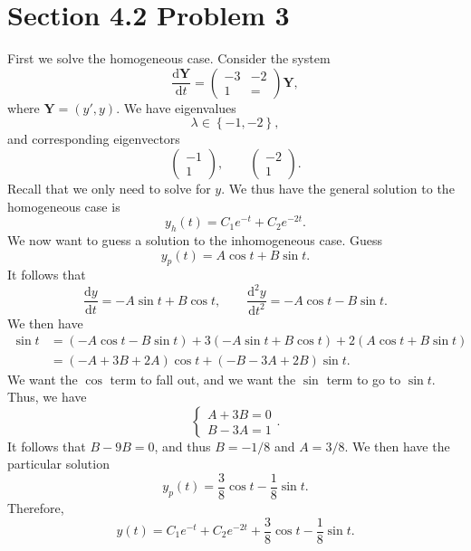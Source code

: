 \documentclass[11pt, letterpaper]{report}
\begin{document}
\section*{Section 4.2 Problem 3}
First we solve the homogeneous case. Consider the system
\[
	\frac{\mathrm{d}\mathbf{Y}}{\mathrm{d}t} =\begin{pmatrix}
		-3&-2\\
		1&=
	\end{pmatrix} \mathbf{Y}
,\]
where $\mathbf{Y}=(y',y)$. We have eigenvalues
\[
	\lambda \in \left\{ -1,-2 \right\} 
,\]
and corresponding eigenvectors
\[
	\begin{pmatrix}
		-1\\
		1
	\end{pmatrix} ,\qquad \begin{pmatrix}
		-2\\
		1
	\end{pmatrix} 
.\]
Recall that we only need to solve for $y$. We thus have the general solution to the homogeneous case is
\[
	y_h(t)=C_1e^{-t}+C_2e^{-2t}
.\]
We now want to guess a solution to the inhomogeneous case. Guess
\[
	y_p(t)=A\cos t+B\sin t
.\]
It follows that
\[
	\frac{\mathrm{d}y}{\mathrm{d}t} =-A\sin t+B\cos t,\qquad \frac{\mathrm{d}^2y}{\mathrm{d}t^2} =-A\cos t-B\sin t
.\]
We then have
\begin{align*}
	\sin t&=\left( -A\cos t-B\sin t \right) +3\left( -A\sin t+B\cos t \right) +2\left( A\cos t+B\sin t \right) \\
	      &=\left( -A+3B+2A \right) \cos t+\left( -B-3A+2B \right) \sin t
.\end{align*}
We want the $\cos $ term to fall out, and we want the $\sin $ term to go to $\sin t$. Thus, we have
\[
	\begin{cases}
		A+3B=0\\
		B-3A=1
	\end{cases}
.\]
It follows that $B-9B=0$, and thus $B=-1 /8$ and $A=3 /8$. We then have the particular solution
\[
	y_p(t)=\frac{3}{8}\cos t-\frac{1}{8}\sin t
.\]
Therefore,
\[
	y(t)=C_1e^{-t}+C_2e^{-2t}+\frac{3}{8}\cos t-\frac{1}{8}\sin t
.\]
\end{document}
